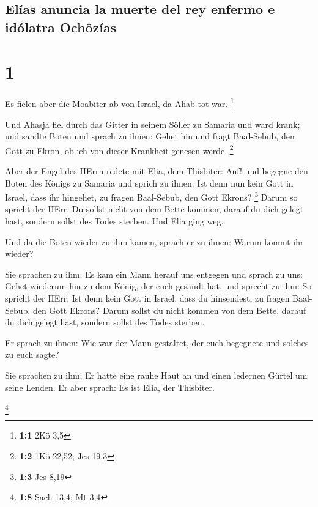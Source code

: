 \hypertarget{eluxedas-anuncia-la-muerte-del-rey-enfermo-e-iduxf3latra-ochuxf4zuxedas}{%
\subsection{Elías anuncia la muerte del rey enfermo e idólatra
Ochôzías}\label{eluxedas-anuncia-la-muerte-del-rey-enfermo-e-iduxf3latra-ochuxf4zuxedas}}

\hypertarget{section}{%
\section{1}\label{section}}

 Es fielen aber die Moabiter ab von Israel, da Ahab tot
war. \footnote{\textbf{1:1} 2Kö 3,5}

 Und Ahasja fiel durch das Gitter in seinem Söller zu
Samaria und ward krank; und sandte Boten und sprach zu ihnen: Gehet hin
und fragt Baal-Sebub, den Gott zu Ekron, ob ich von dieser Krankheit
genesen werde. \footnote{\textbf{1:2} 1Kö 22,52; Jes 19,3}

 Aber der Engel des HErrn redete mit Elia, dem Thisbiter:
Auf! und begegne den Boten des Königs zu Samaria und sprich zu ihnen:
Ist denn nun kein Gott in Israel, dass ihr hingehet, zu fragen
Baal-Sebub, den Gott Ekrons? \footnote{\textbf{1:3} Jes 8,19}
 Darum so spricht der HErr: Du sollst nicht von dem Bette
kommen, darauf du dich gelegt hast, sondern sollst des Todes sterben.
Und Elia ging weg.

 Und da die Boten wieder zu ihm kamen, sprach er zu ihnen:
Warum kommt ihr wieder?

 Sie sprachen zu ihm: Es kam ein Mann herauf uns entgegen
und sprach zu uns: Gehet wiederum hin zu dem König, der euch gesandt
hat, und sprecht zu ihm: So spricht der HErr: Ist denn kein Gott in
Israel, dass du hinsendest, zu fragen Baal-Sebub, den Gott Ekrons? Darum
sollst du nicht kommen von dem Bette, darauf du dich gelegt hast,
sondern sollst des Todes sterben.

 Er sprach zu ihnen: Wie war der Mann gestaltet, der euch
begegnete und solches zu euch sagte?

 Sie sprachen zu ihm: Er hatte eine rauhe Haut an und
einen ledernen Gürtel um seine Lenden. Er aber sprach: Es ist Elia, der
Thisbiter.

\footnote{\textbf{1:8} Sach 13,4; Mt 3,4}

